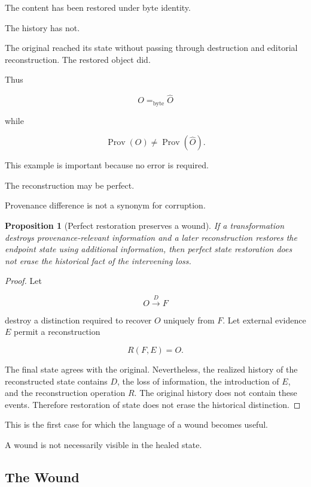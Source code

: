 \documentclass[
  11pt,
  a4paper,
  DIV=12,
  BCOR=0mm,
  parskip=half-
]{scrartcl}
\newcommand{\eqbyte}{=_{\mathrm{byte}}}
\newcommand{\Prov}{\operatorname{Prov}}
\theoremstyle{definition}
\theoremstyle{plain}
\newtheorem{proposition}[definition]{Proposition}
\theoremstyle{remark}
\begin{document}
The content has been restored under byte identity.

The history has not.

The original reached its state without passing through destruction and
editorial reconstruction. The restored object did.

Thus

\[
  O\eqbyte\widehat O
\]

while

\[
  \Prov(O)\neq\Prov(\widehat O).
\]

This example is important because no error is required.

The reconstruction may be perfect.

Provenance difference is not a synonym for corruption.

\begin{proposition}[Perfect restoration preserves a wound]
\label{prop:restoration-wound}
If a transformation destroys provenance-relevant information and a later
reconstruction restores the endpoint state using additional information, then
perfect state restoration does not erase the historical fact of the
intervening loss.
\end{proposition}

\begin{proof}
Let

\[
  O\xrightarrow{D}F
\]

destroy a distinction required to recover \(O\) uniquely from \(F\). Let
external evidence \(E\) permit a reconstruction

\[
  R(F,E)=O.
\]

The final state agrees with the original. Nevertheless, the realized history
of the reconstructed state contains \(D\), the loss of information, the
introduction of \(E\), and the reconstruction operation \(R\). The original
history does not contain these events. Therefore restoration of state does not
erase the historical distinction.
\end{proof}

This is the first case for which the language of a wound becomes useful.

A wound is not necessarily visible in the healed state.


\subsection{The Wound}
\label{sec:wound}
\end{document}
